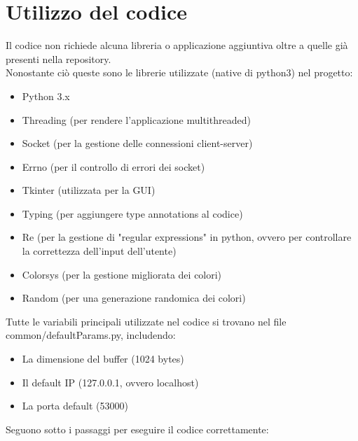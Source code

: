 \documentclass[12pt]{article}
\begin{document}
\section{Utilizzo del codice}
Il codice non richiede alcuna libreria o applicazione aggiuntiva oltre a quelle già presenti nella repository. 
\\
Nonostante ciò queste sono le librerie utilizzate (native di python3) nel progetto:
\begin{itemize}
  \item Python 3.x
  \item Threading (per rendere l'applicazione multithreaded)
  \item Socket (per la gestione delle connessioni client-server)
  \item Errno (per il controllo di errori dei socket)
  \item Tkinter (utilizzata per la GUI)
  \item Typing (per aggiungere type annotations al codice)
  \item Re (per la gestione di "regular expressions" in python, ovvero per controllare la correttezza dell'input dell'utente)
  \item Colorsys (per la gestione migliorata dei colori)
  \item Random (per una generazione randomica dei colori)
\end{itemize}
Tutte le variabili principali utilizzate nel codice si trovano nel file common/defaultParams.py, includendo:
\begin{itemize}
    \item La dimensione del buffer (1024 bytes)
    \item Il default IP (127.0.0.1, ovvero localhost)
    \item La porta default (53000)
\end{itemize}
Seguono sotto i passaggi per eseguire il codice correttamente:
\end{document}
